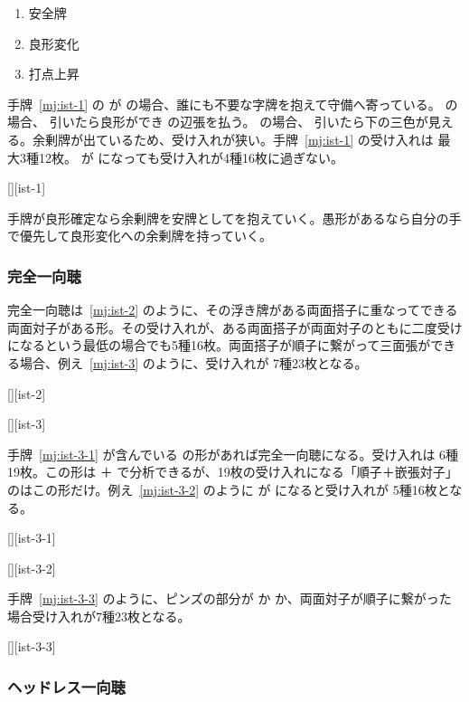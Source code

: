 \documentclass[../nankiru_main.tex]{subfiles}
\begin{document}
\begin{enumerate}
  \item 安全牌
  \item 良形変化
  \item 打点上昇
\end{enumerate}

手牌~\ref{mj:ist-1} の  が  の場合、誰にも不要な字牌を抱えて守備へ寄っている。 の場合、 引いたら良形ができ  の辺張を払う。 の場合、 引いたら下の三色が見える。余剰牌が出ているため、受け入れが狭い。手牌~\ref{mj:ist-1} の受け入れは  最大3種12枚。 が  になっても受け入れが4種16枚に過ぎない。

[][ist-1]

手牌が良形確定なら余剰牌を安牌としてを抱えていく。愚形があるなら自分の手で優先して良形変化への余剰牌を持っていく。


\subsubsection*{完全一向聴} 

完全一向聴は~\ref{mj:ist-2} のように、その浮き牌がある両面搭子に重なってできる両面対子がある形。その受け入れが、ある両面搭子が両面対子のともに二度受けになるという最低の場合でも5種16枚。両面搭子が順子に繋がって三面張ができる場合、例え~\ref{mj:ist-3} のように、受け入れが  7種23枚となる。

[][ist-2]

[][ist-3]

手牌~\ref{mj:ist-3-1} が含んでいる  の形があれば完全一向聴になる。受け入れは  6種19枚。この形は ＋ で分析できるが、19枚の受け入れになる「順子＋嵌張対子」のはこの形だけ。例え~\ref{mj:ist-3-2} のように  が  になると受け入れが  5種16枚となる。

[][ist-3-1]

[][ist-3-2]

手牌~\ref{mj:ist-3-3} のように、ピンズの部分が  か  か、両面対子が順子に繋がった場合受け入れが7種23枚となる。

[][ist-3-3]


\subsubsection*{ヘッドレス一向聴} 
\end{document}
